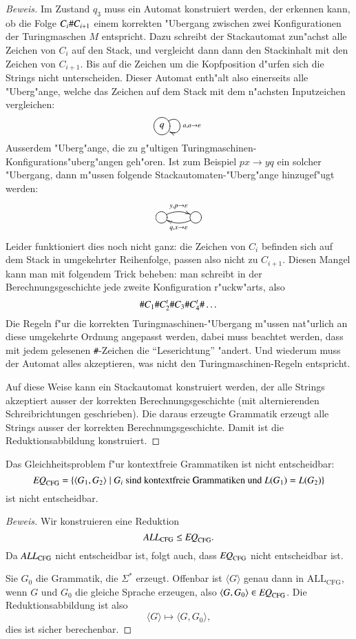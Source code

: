 \begin{proof}[Beweis]
Im Zustand $q_3$ muss ein Automat konstruiert werden, der erkennen kann,
ob die Folge $C_i{\tt\#}C_{i+1}$ einem korrekten "Ubergang zwischen
zwei Konfigurationen der Turingmaschen $M$ entspricht. Dazu schreibt
der Stackautomat zun"achst alle Zeichen von $C_i$ auf den
Stack, und vergleicht dann dann den Stackinhalt mit den Zeichen von
$C_{i+1}$. Bis auf die Zeichen um die Kopfposition d"urfen sich
die Strings nicht unterscheiden. Dieser Automat enth"alt also
einerseits alle "Uberg"ange, welche das Zeichen auf dem Stack
mit dem n"achsten Inputzeichen vergleichen:
\[
\entrymodifiers={++[o][F]}
\xymatrix{
q\ar@(ur,dr)^{a,a\to\varepsilon}
}
\]
Ausserdem "Uberg"ange, die zu g"ultigen
Turingmaschinen-Konfigurations"uberg"angen geh"oren. Ist zum Beispiel
$px\to yq$ ein solcher "Ubergang, dann m"ussen folgende
Stackautomaten-"Uberg"ange hinzugef"ugt werden:
\[
\entrymodifiers={++[o][F]}
\xymatrix{
{}\ar@/^/[r]^{y,p\to\varepsilon}
	&\ar@/^/[l]^{q,x\to\varepsilon}
}
\]
Leider funktioniert dies noch nicht ganz: die Zeichen von $C_i$
befinden sich auf dem Stack in umgekehrter Reihenfolge, passen
also nicht zu $C_{i+1}$. Diesen Mangel kann man mit folgendem
Trick beheben: man schreibt in der Berechnungsgeschichte jede
zweite Konfiguration r"uckw"arts, also
\[
{\tt\#}C_1{\tt\#}C_2^t{\tt\#}C_3{\tt\#}C_4^t{\tt\#}\dots
\]
Die Regeln f"ur die korrekten Turingmaschinen-"Ubergang m"ussen
nat"urlich an diese umgekehrte Ordnung angepasst werden, dabei
muss beachtet werden, dass mit jedem gelesenen {\tt\#}-Zeichen
die ``Leserichtung'' "andert. Und wiederum muss der Automat alles
akzeptieren, was nicht den Turingmaschinen-Regeln entspricht.

Auf diese Weise kann ein Stackautomat konstruiert werden, der
alle Strings akzeptiert ausser der korrekten Berechnungsgeschichte
(mit alternierenden Schreibrichtungen geschrieben). Die daraus
erzeugte Grammatik erzeugt alle Strings ausser der
korrekten Berechnungsgeschichte. Damit ist die Reduktionsabbildung
konstruiert.
\end{proof}

\begin{satz}
Das Gleichheitsproblem f"ur kontextfreie Grammatiken
ist nicht entscheidbar:
\[
\text{\it EQ}_{\text{CFG}}=\{
\langle G_1,G_2\rangle\;|\;\text{$G_i$ sind kontextfreie Grammatiken
und $L(G_1)=L(G_2)$}
\}
\]
ist nicht entscheidbar.
\end{satz}

\begin{proof}[Beweis]
Wir konstruieren eine Reduktion
\[
\text{\it ALL}_{\text{CFG}}
\le
\text{\it EQ}_{\text{CFG}}.
\]
Da $\text{\it ALL}_{\text{CFG}}$ nicht entscheidbar ist, folgt
auch, dass $\text{\it EQ}_{\text{CFG}}$ nicht entscheidbar
ist.

Sie $G_0$ die Grammatik, die $\Sigma^*$ erzeugt. Offenbar ist
$\langle G\rangle$ genau dann in $\text{ALL}_{\text{CFG}}$,
wenn $G$ und $G_0$ die gleiche Sprache erzeugen, also
$\langle G,G_0\rangle\in\text{\it EQ}_{\text{CFG}}$.
Die Reduktionsabbildung ist also
\[
\langle G\rangle \mapsto \langle G,G_0\rangle,
\]
dies ist sicher berechenbar.
\end{proof}


